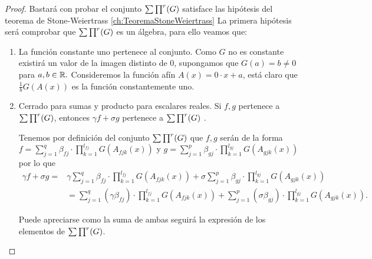 \begin{proof}
    Bastará con probar el conjunto $\sum \prod^r (G)$ satisface las hipótesis del teorema de Stone-Weiertrass \ref{ch:TeoremaStoneWeiertrass}
    La primera hipótesis será comprobar que $\sum \prod^r (G)$ es un álgebra, para ello veamos que:         
    \begin{enumerate}
        \item La función constante uno pertenece al conjunto. 
        Como $G$ no es constante existirá un valor de la imagen distinto de $0$, supongamos que $G(a)= b \neq 0$ para $a,b \in \mathbb{R}.$
        Consideremos la función afín $A(x) = 0 \cdot x + a$, está claro que $\frac{1}{b}G(A(x))$ es la función constantemente uno. 
        \item Cerrado para sumas y producto para escalares reales. 
        Si $f,g$ pertenece a  $\sum \prod^r (G)$, entonces $\gamma f + \sigma g$ pertenece a $\sum \prod^r (G)$ .
        
        Tenemos por definición del conjunto $\sum \prod^r (G)$
        que $f,g$ serán de la forma $f = \sum_{j = 1} ^q  \beta_{fj} \cdot \prod_{k=1}^{l_{fj}}  G(A_{fjk}(x))$ y 
        $g = \sum_{j = 1} ^p  \beta_{gj} \cdot \prod_{k=1}^{l_{gj}}G(A_{gjk}(x))$  por lo que
        \begin{equation}
            \begin{split}
                \gamma f+ \sigma g =& \gamma \sum_{j = 1} ^q  \beta_{fj} \cdot \prod_{k=1}^{l_{fj}}  G(A_{fjk}(x)) + 
                \sigma \sum_{j = 1} ^p  \beta_{gj} \cdot \prod_{k=1}^{l_{gj}}G(A_{gjk}(x)) \\
                & = \sum_{j = 1} ^q  (\gamma \beta_{fj}) \cdot \prod_{k=1}^{l_{fj}}  G(A_{fjk}(x)) + 
                \sum_{j = 1} ^p  (\sigma \beta_{gj}) \cdot \prod_{k=1}^{l_{gj}}G(A_{gjk}(x)).
            \end{split}
        \end{equation}
        
        Puede apreciarse como la suma de ambas seguirá la expresión de los elementos de $\sum \prod^r (G)$. 
        

\end{enumerate}
\end{proof}
